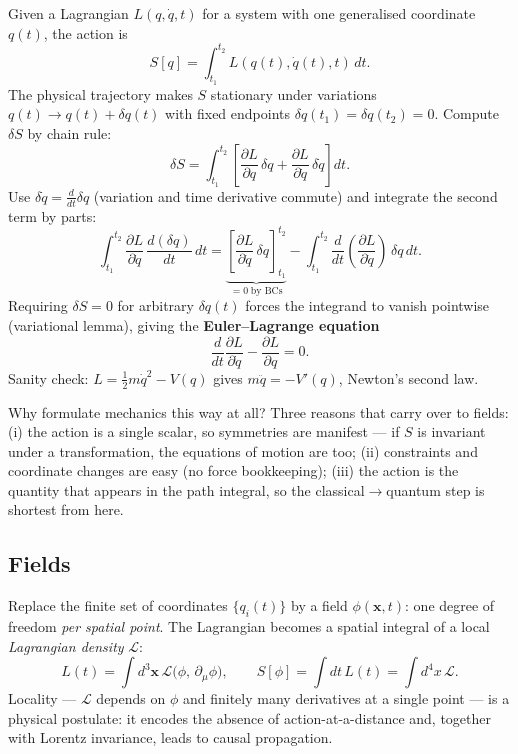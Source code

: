 \documentclass[12pt]{article}
\newcommand{\bx}{\mathbf{x}}
\newcommand{\Lag}{\mathcal{L}}
\begin{document}
Given a Lagrangian $L(q,\dot q,t)$ for a system with one generalised
coordinate $q(t)$, the action is
%
\begin{equation}
  S[q] = \int_{t_1}^{t_2}\! L(q(t),\dot q(t), t)\,dt.
  \label{eq:action_mech}
\end{equation}
%
The physical trajectory makes $S$ stationary under variations
$q(t)\to q(t) + \delta q(t)$ with fixed endpoints
$\delta q(t_1) = \delta q(t_2) = 0$.  Compute $\delta S$ by chain
rule:
%
\begin{equation}
  \delta S
    = \int_{t_1}^{t_2}\!
        \left[
          \frac{\partial L}{\partial q}\,\delta q
          + \frac{\partial L}{\partial\dot q}\,\delta\dot q
        \right] dt.
\end{equation}
%
Use $\delta\dot q = \frac{d}{dt}\delta q$ (variation and time
derivative commute) and integrate the second term by parts:
%
\begin{equation}
  \int_{t_1}^{t_2}\!\frac{\partial L}{\partial\dot q}\,
    \frac{d(\delta q)}{dt}\,dt
   = \underbrace{\left[\frac{\partial L}{\partial\dot q}\,\delta q\right]_{t_1}^{t_2}}_{=0\;\text{by BCs}}
     - \int_{t_1}^{t_2}\!\frac{d}{dt}\!\left(\frac{\partial L}{\partial\dot q}\right)\,\delta q\,dt.
\end{equation}
%
Requiring $\delta S = 0$ for arbitrary $\delta q(t)$ forces the
integrand to vanish pointwise (variational lemma), giving the
\textbf{Euler--Lagrange equation}
%
\begin{equation}
  \frac{d}{dt}\!\frac{\partial L}{\partial\dot q}
    - \frac{\partial L}{\partial q} = 0.
  \label{eq:EL_mech}
\end{equation}
%
Sanity check: $L = \tfrac{1}{2}m\dot q^2 - V(q)$ gives
$m\ddot q = -V'(q)$, Newton's second law.

Why formulate mechanics this way at all?  Three reasons that carry
over to fields: (i) the action is a single scalar, so symmetries are
manifest --- if $S$ is invariant under a transformation, the equations
of motion are too; (ii) constraints and coordinate changes are easy
(no force bookkeeping); (iii) the action is the quantity that appears
in the path integral, so the classical$\to$quantum step is shortest
from here.

\subsection{Fields}
\label{sec:action_field}

Replace the finite set of coordinates $\{q_i(t)\}$ by a field
$\phi(\bx, t)$: one degree of freedom \emph{per spatial point}.  The
Lagrangian becomes a spatial integral of a local \emph{Lagrangian
density} $\Lag$:
%
\begin{equation}
  L(t) = \int d^3\bx\,\Lag\bigl(\phi,\,\partial_\mu\phi\bigr),
  \qquad
  S[\phi] = \int dt\,L(t) = \int d^4x\,\Lag.
  \label{eq:action_field}
\end{equation}
%
Locality --- $\Lag$ depends on $\phi$ and finitely many derivatives at
a single point --- is a physical postulate: it encodes the absence of
action-at-a-distance and, together with Lorentz invariance, leads to
causal propagation.
\end{document}
